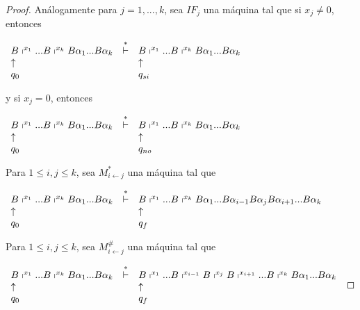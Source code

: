 \begin{proof}
		\bigskip

	 	\noindent Análogamente para $j=1,...,k$, sea $IF_{j}$ una máquina tal que si $ x_{j}\neq 0$, entonces

		\bigskip

    $\displaystyle \begin{array}{lcl} B\shortmid ^{x_{1}}...B\shortmid ^{x_{k}}B\alpha _{1}...B\alpha _{k} &
    \overset{\ast }{\vdash } & B\shortmid ^{x_{1}}...B\shortmid ^{x_{k}}B\alpha _{1}...B\alpha _{k} \\
    \uparrow & & \uparrow \\ q_{0} & & q_{si} \end{array} $

		\bigskip

	  \noindent y si $x_{j}=0$, entonces

		\bigskip

    $\displaystyle \begin{array}{lcl} B\shortmid ^{x_{1}}...B\shortmid ^{x_{k}}B\alpha _{1}...B\alpha _{k} &
    \overset{\ast }{\vdash } & B\shortmid ^{x_{1}}...B\shortmid ^{x_{k}}B\alpha _{1}...B\alpha _{k} \\
    \uparrow & & \uparrow \\ q_{0} & & q_{no} \end{array} $

		\bigskip

	  \noindent Para $1\leq i,j\leq k$, sea $M_{i\leftarrow j}^{\ast }$ una máquina tal que

		\bigskip

    $\displaystyle \begin{array}{lcl} B\shortmid ^{x_{1}}...B\shortmid ^{x_{k}}B\alpha _{1}...B\alpha _{k} &
    \overset{\ast }{\vdash } & B\shortmid ^{x_{1}}...B\shortmid
    ^{x_{k}}B\alpha _{1}...B\alpha _{i-1}B\alpha _{j}B\alpha _{i+1}...B\alpha _{k} \\
    \uparrow & & \uparrow \\ q_{0} & & q_{f} \end{array} $

		\bigskip

    \noindent Para $1\leq i,j\leq k$, sea $M_{i\leftarrow j}^{\#}$ una máquina tal que

		\bigskip

    $\displaystyle \begin{array}{lcl} B\shortmid ^{x_{1}}...B\shortmid ^{x_{k}}B\alpha _{1}...B\alpha _{k} &
    \overset{\ast }{\vdash } & B\shortmid ^{x_{1}}...B\shortmid ^{x_{i-1}}B\shortmid ^{x_{j}}B\shortmid
    ^{x_{i+1}}...B\shortmid ^{x_{k}}B\alpha _{1}...B\alpha _{k} \\ \uparrow & & \uparrow \\ q_{0} & & q_{f} \end{array} $


\end{proof}
